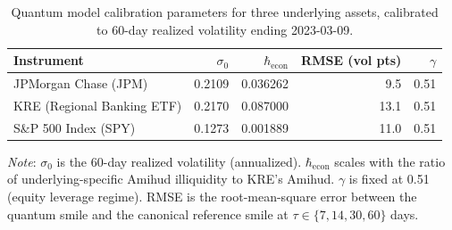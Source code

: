 \begin{table}[htbp]
\centering
\caption{Quantum model calibration parameters for three underlying assets, calibrated to 60-day realized volatility ending 2023-03-09.}
\label{tab:iv-calibration}
\begin{tabular}{lrrrr}
\hline
Instrument & $\sigma_0$ & $\hbar_{\mathrm{econ}}$ & RMSE (vol pts) & $\gamma$ \\
\hline
JPMorgan Chase (JPM)                               & 0.2109 & 0.036262 & 9.5 & 0.51 \\
KRE (Regional Banking ETF)                         & 0.2170 & 0.087000 & 13.1 & 0.51 \\
S\&P 500 Index (SPY)                               & 0.1273 & 0.001889 & 11.0 & 0.51 \\
\hline
\end{tabular}

\medskip
\footnotesize
\textit{Note}: $\sigma_0$ is the 60-day realized volatility (annualized). $\hbar_{\mathrm{econ}}$ scales with the ratio of underlying-specific Amihud illiquidity to KRE's Amihud. $\gamma$ is fixed at 0.51 (equity leverage regime). RMSE is the root-mean-square error between the quantum smile and the canonical reference smile at $\tau \in \{7, 14, 30, 60\}$ days.
\end{table}
